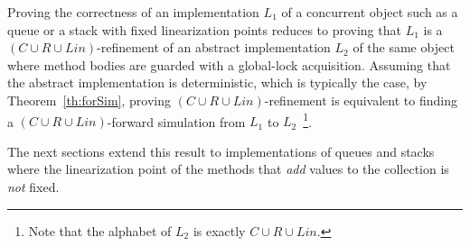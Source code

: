 Proving the correctness of an implementation $L_1$ of a concurrent object such as a queue or a stack with fixed linearization points
reduces to proving that $L_1$ is a $(C\cup R\cup Lin)$-refinement of an abstract implementation $L_2$ of the same object where method
bodies are guarded with a global-lock acquisition. Assuming that the abstract implementation is deterministic, which is typically the case,
by Theorem~\ref{th:forSim}, proving $(C\cup R\cup Lin)$-refinement is equivalent to finding a $(C\cup R\cup Lin)$-forward simulation 
from $L_1$ to $L_2$~\footnote{Note that the alphabet of $L_2$ is exactly $C\cup R\cup Lin$.}.

The next sections extend this result to implementations of queues and stacks where the linearization point of the methods 
that \emph{add} values to the collection is \emph{not} fixed.
